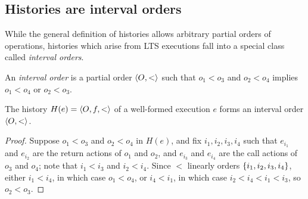 

\subsection{Histories are interval orders}

While the general definition of histories allows arbitrary partial orders of
operations, histories which arise from LTS executions fall into a special class
called \emph{interval orders}.

\begin{definition}

  An \emph{interval order} is a partial order $\left\langle {O,<} \right\rangle$ such that
  $o_1 < o_3$ and $o_2 < o_4$ implies $o_1 < o_4$ or $o_2 < o_3$.

\end{definition}

\begin{lemma}
  \label{lem:intervals}

  The history $H(e) = \left\langle {O,f,<} \right\rangle$ of a well-formed execution $e$ forms an
  interval order $\left\langle {O,<} \right\rangle$.

\end{lemma}

\begin{proof}

  Suppose $o_1 < o_3$ and $o_2 < o_4$ in $H(e)$, and fix $i_1, i_2, i_3, i_4$
  such that $e_{i_1}$ and $e_{i_2}$ are the return actions of $o_1$ and $o_2$,
  and $e_{i_3}$ and $e_{i_4}$ are the call actions of $o_3$ and $o_4$; note
  that $i_1 < i_3$ and $i_2 < i_4$. Since $<$ linearly orders ${\{ i_1, i_2,
  i_3, i_4 \}}$, either $i_1 < i_4$, in which case $o_1 < o_4$, or $i_4 < i_1$, in
  which case $i_2 < i_4 < i_1 < i_3$, so $o_2 < o_3$.

\end{proof}

